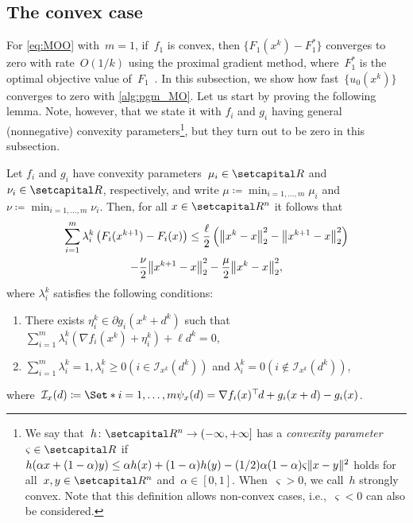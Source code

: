 \documentclass[../../main]{subfiles}
\begin{document}
\subsection{The convex case}
For \cref{eq:MOO} with~$m = 1$, if~$f_1$ is convex, then $\{ F_1(x^k) - F_1^\ast \}$ converges to zero with rate~$O(1/k)$ using the proximal gradient method, where~$F_1^\ast$ is the optimal objective value of~$F_1$~\cite{Beck2009}.
In this subsection, we show how fast~$\{u_0(x^k)\}$ converges to zero with \cref{alg:pgm_MO}.
Let us start by proving the following lemma.
Note, however, that we state it with $f_i$ and $g_i$ having general (nonnegative) convexity parameters\footnote{We say that~$h \colon \setR^n \to (-\infty, +\infty]$ has a \emph{convexity parameter}~$\varsigma \in \setR$ if~$h(\alpha x + (1 - \alpha)y) \le \alpha h(x) + (1 - \alpha)h(y) - (1 / 2)\alpha (1 - \alpha) \varsigma \lVert x - y\rVert^2$ holds for all~$x, y \in \setR^n$ and~$\alpha \in [0, 1]$. When~$\varsigma > 0$, we call~$h$ strongly convex. Note that this definition allows non-convex cases, i.e.,~$\varsigma < 0$ can also be considered.}, but they turn out to be zero in this subsection.
\begin{lemma} \label{lem:without_line_lem}
	Let $f_i$ and $g_i$ have convexity parameters~$\mu_i \in \setR$ and $\nu_i \in \setR$, respectively, and write $\mu \coloneqq \min_{i = 1, \dots, m} \mu_i$ and $\nu \coloneqq \min_{i = 1, \dots, m} \nu_i$.
    Then, for all $x \in \setR^n$ it follows that
    \begin{multline}
        \sum_{i = 1}^m \lambda_i^k \left(F_i(x^{k + 1}) - F_i(x)\right) \le \frac{\ell}{2} \left( \norm*{ x^k - x}_2^2 - \norm*{ x^{k + 1} - x}_2^2 \right) \\
        - \frac{\nu}{2} \norm*{ x^{k + 1} - x }_2^2 - \frac{\mu}{2} \norm*{ x^k - x}_2^2,
    \end{multline}
	where $\lambda_i^k$ satisfies the following conditions:
    \begin{enumerate}
        \item There exists $\eta_i^k \in \partial g_i(x^k + d^k)$ such that $\sum_{i = 1}^m \lambda_i^k (\nabla f_i(x^k) + \eta_i^k) + \ell d^k = 0$,
        \item $\sum_{i = 1}^m \lambda_i^k = 1, \lambda_i^k \ge 0 \left(i \in \mathcal{I}_{x^k}(d^k)\right)$ and $\lambda_i^k = 0 \left(i \notin \mathcal{I}_{x^k}(d^k)\right)$,
    \end{enumerate}
	where~$\mathcal{I}_x(d) \coloneqq \Set*{i = 1, \dots, m}{\psi_x(d) = \nabla f_i(x)^\T d + g_i(x + d) - g_i(x)}$.
\end{lemma}
\end{document}
